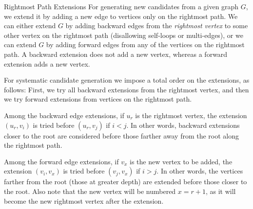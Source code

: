 \ifdefined\wox \begin{frame} \titlepage \end{frame} \fi


\begin{frame}[fragile]{Rightmost Path Extensions}
  \small
For generating new candidates from a given graph $G$, we extend it
by adding a new edge to vertices only on the rightmost path.  We can
either extend $G$ by adding backward edges from the {\em rightmost
vertex} to some other vertex on the rightmost path (disallowing
self-loops or multi-edges), or we can extend $G$ by adding forward edges
from any of the vertices on the rightmost path. A backward extension does
not add a new vertex, whereas a forward extension adds a new vertex.

\bigskip
For systematic candidate generation we impose a total order on the
extensions, as follows:
F{i}rst, we try all backward extensions from the rightmost
vertex, and then we try forward extensions from vertices on the
rightmost path.  

\medskip
Among the backward edge extensions, if $u_r$ is the
rightmost vertex, the extension $(u_r,v_i)$ is tried before $(u_r,v_{j})$
if $i < j$.  In other words, backward extensions closer to the root are
considered before those farther away from the root along the rightmost
path.  

\medskip
Among the forward edge extensions, if $v_x$ is the new vertex to
be added, the extension $(v_i,v_x)$ is tried before $(v_{j}, v_x)$ if $i >
j$. In other words, the vertices farther from the root (those at
greater depth) are extended
before those closer to the root. Also note that the new vertex will be
numbered $x=r+1$, as it will become the new rightmost vertex after
the extension.

\end{frame}


